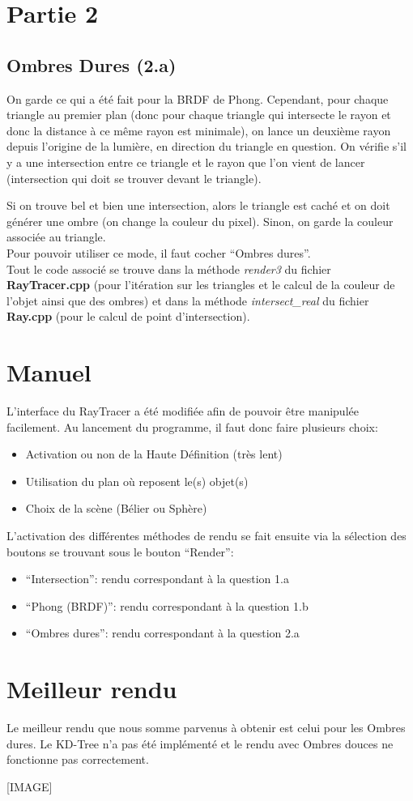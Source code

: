 \documentclass[a4paper,11pt,titlepage]{article}
\begin{document}
\newpage
\section{Partie 2}

\subsection{Ombres Dures (2.a)}

On garde ce qui a été fait pour la BRDF de Phong. Cependant, pour chaque triangle au premier plan (donc pour chaque triangle qui intersecte le rayon et donc la distance à ce même rayon est minimale), on lance un deuxième rayon depuis l'origine de la lumière, en direction du triangle en question. On vérifie s'il y a une intersection entre ce triangle et le rayon que l'on vient de lancer (intersection qui doit se trouver devant le triangle).

Si on trouve bel et bien une intersection, alors le triangle est caché et on doit générer une ombre (on change la couleur du pixel). Sinon, on garde la couleur associée au triangle.\\

Pour pouvoir utiliser ce mode, il faut cocher ``Ombres dures''.\\

Tout le code associé se trouve dans la méthode \textit{render3} du fichier \textbf{RayTracer.cpp} (pour l'itération sur les triangles et le calcul de la couleur de l'objet ainsi que des ombres) et dans la méthode \textit{intersect\_real} du fichier \textbf{Ray.cpp} (pour le calcul de point d'intersection).

\section{Manuel}

L'interface du RayTracer a été modifiée afin de pouvoir être manipulée facilement. Au lancement du programme, il faut donc faire plusieurs choix:
\begin{itemize}
 \item Activation ou non de la Haute Définition (très lent)
 \item Utilisation du plan où reposent le(s) objet(s)
 \item Choix de la scène (Bélier ou Sphère)\\
\end{itemize}

L'activation des différentes méthodes de rendu se fait ensuite via la sélection des boutons se trouvant sous le bouton ``Render'':
\begin{itemize}
 \item ``Intersection'': rendu correspondant à la question 1.a
 \item ``Phong (BRDF)'': rendu correspondant à la question 1.b
 \item ``Ombres dures'': rendu correspondant à la question 2.a
\end{itemize}

\section{Meilleur rendu}

Le meilleur rendu que nous somme parvenus à obtenir est celui pour les Ombres dures.
Le KD-Tree n'a pas été implémenté et le rendu avec Ombres douces ne fonctionne pas correctement.

[IMAGE]
\end{document}
